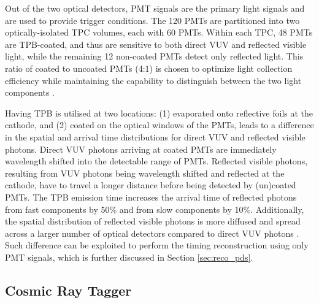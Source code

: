 Out of the two optical detectors, PMT signals are the primary light signals and are used to provide trigger conditions.
The 120 PMTs are partitioned into two optically-isolated TPC volumes, each with 60 PMTs.
Within each TPC, 48 PMTs are TPB-coated, and thus are sensitive to both direct VUV and reflected visible light, while the remaining 12 non-coated PMTs detect only reflected light. 
This ratio of coated to uncoated PMTs (4:1) is chosen to optimize light collection efficiency while maintaining the capability to distinguish between the two light components \cite{sbnd_pds_paper}. 

Having TPB is utilised at two locations: (1) evaporated onto reflective foils at the cathode, and (2) coated on the optical windows of the PMTs, leads to a difference in the spatial and arrival time distributions for direct VUV and reflected visible photons.
Direct VUV photons arriving at coated PMTs are immediately wavelength shifted into the detectable range of PMTs.
Reflected visible photons, resulting from VUV photons being wavelength shifted and reflected at the cathode, have to travel a longer distance before being detected by (un)coated PMTs.
The TPB emission time increases the arrival time of reflected photons from fast components by 50\% and from slow components by 10\%.
Additionally, the spatial distribution of reflected visible photons is more diffused and spread across a larger number of optical detectors compared to direct VUV photons \cite{PatrickPhD}.
Such difference can be exploited to perform the timing reconstruction using only PMT signals, which is further discussed in Section \ref{sec:reco_pds}.

\subsection{Cosmic Ray Tagger}
\label{sec:sbnd_crt}

